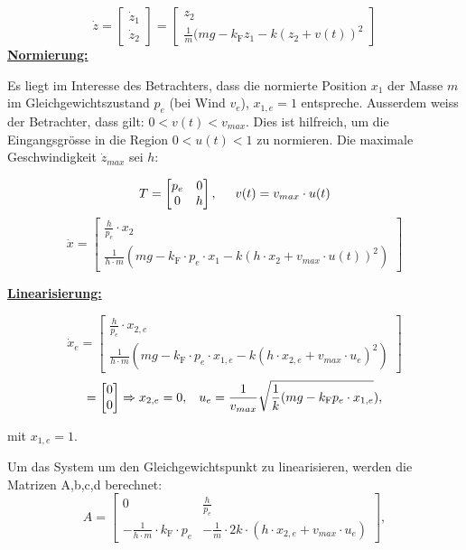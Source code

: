 	        \[\dot{z} = \begin{bmatrix} \dot{z}_1 \\ \dot{z}_2 \end{bmatrix} = \begin{bmatrix} z_2 \\ \frac{1}{m}(mg-k_\textrm{F}z_1-k(z_2+v(t))^2 \end{bmatrix}\]
        \textbf{\underline{Normierung:}}
            
            Es liegt im Interesse des Betrachters, dass die normierte Position $x_1$ der Masse $m$ im Gleichgewichtszustand $p_e$ (bei Wind $v_e$), $x_{1,e} = 1$ entspreche. Ausserdem weiss der Betrachter, dass gilt: $0 < v(t) < v_{max}$. Dies ist hilfreich, um die Eingangsgrösse in die Region $0 < u(t) < 1$ zu normieren. Die maximale Geschwindigkeit $\dot{z}_{max}$ sei $h$:
            
            \[ T = \begin{bmatrix} p_e & 0 \\ 0 & h \end{bmatrix}, \hspace{5mm} v(t) = v_{max} \cdot u(t)\]
            \[\dot{x} = \begin{bmatrix} \frac{h}{p_e}\cdot x_2 \\ \frac{1}{h \cdot m}(mg-k_\textrm{F} \cdot p_e \cdot x_1 - k(h\cdot x_2+v_{max} \cdot u(t))^2)\end{bmatrix} \]
            
        \textbf{\underline{Linearisierung:}}
            
            \[\dot{x}_e = \begin{bmatrix}\frac{h}{p_e}\cdot x_{2,e} \\ \frac{1}{h \cdot m}(mg-k_\textrm{F} \cdot p_e \cdot x_{1,e} - k(h\cdot x_{2,e}+v_{max} \cdot u_e)^2)\end{bmatrix} \]	
            \[= \begin{bmatrix} 0 \\ 0\end{bmatrix} \Rightarrow x_{2,e} = 0, \hspace{3mm} u_e = \frac{1}{v_{max}}\sqrt{\frac{1}{k}(mg-k_\textrm{F}p_e\cdot x_{1,e}}), \]
            
            mit $x_{1,e}=1$.
            	
            Um das System um den Gleichgewichtspunkt zu linearisieren, werden die Matrizen A,b,c,d berechnet:
            \[A = \begin{bmatrix} 0 & \frac{h}{p_e} \\ -\frac{1}{h \cdot m} \cdot k_\textrm{F} \cdot p_e & -\frac{1}{m}\cdot 2k \cdot(h\cdot x_{2,e} + v_{max} \cdot u_e) \end{bmatrix},\]
            
